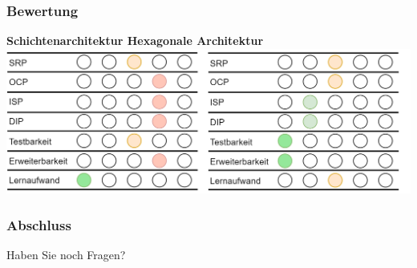 \documentclass[9pt]{beamer}
\def\footerimage{assets/Progress.png}
\begin{document}
\def\footerimage{assets/Progress5.png}
\begin{frame}
	\frametitle{Bewertung}
	
	\textbf{\color{primary} Schichtenarchitektur \hspace{2.5cm} Hexagonale Architektur }  \\[0.2cm]
	\includegraphics[width=\linewidth]{assets/Bewertung.png}
	
\end{frame}

\begin{frame}
	\frametitle{Abschluss}
	
	\centering
	\Huge Haben Sie noch Fragen?
	
\end{frame}
\end{document}
